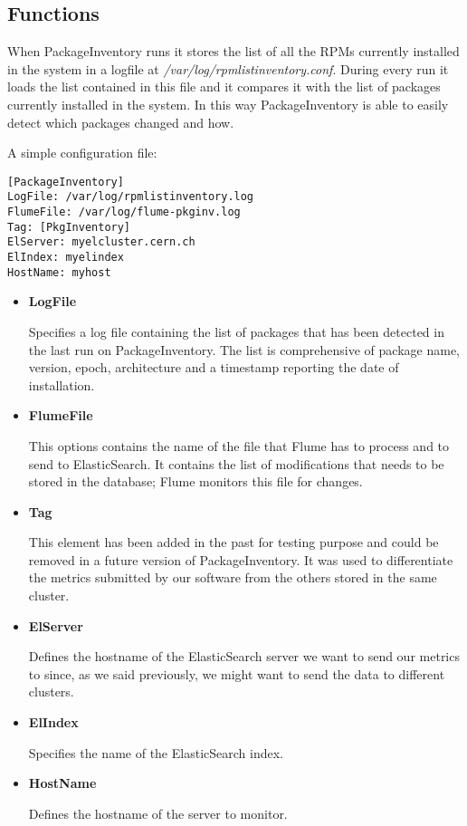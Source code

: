 \subsection{Functions}

When PackageInventory runs it stores the list of all the RPMs currently
installed in the system in a logfile at
\textit{/var/log/rpmlistinventory.conf}. During every run it loads the
list contained in this file and it compares it with the list of packages
currently installed in the system. In this way PackageInventory is able to
easily detect which packages changed and how.

A simple configuration file:

\begin{lstlisting}[frame=single]
[PackageInventory]
LogFile: /var/log/rpmlistinventory.log
FlumeFile: /var/log/flume-pkginv.log
Tag: [PkgInventory]
ElServer: myelcluster.cern.ch
ElIndex: myelindex
HostName: myhost
\end{lstlisting}

\begin{itemize}
  \item \textbf{LogFile}
  
  Specifies a log file containing the list of packages that has been
  detected in the last run on PackageInventory. The list is comprehensive
  of package name, version, epoch, architecture and a timestamp reporting
  the date of installation.
  
  \item \textbf{FlumeFile}

  This options contains the name of the file that Flume has to process and
  to send to ElasticSearch. It contains the list of modifications that
  needs to be stored in the database; Flume monitors this file for
  changes.

  \item \textbf{Tag}

  This element has been added in the past for testing purpose and could be
  removed in a future version of PackageInventory. It was used to
  differentiate the metrics submitted by our software from the others
  stored in the same cluster.

  \item \textbf{ElServer}

  Defines the hostname of the ElasticSearch server we want to send our
  metrics to since, as we said previously, we might want to send the data
  to different clusters.

  \item \textbf{ElIndex}

  Specifies the name of the ElasticSearch index.

  \item \textbf{HostName}

  Defines the hostname of the server to monitor.

\end{itemize}

